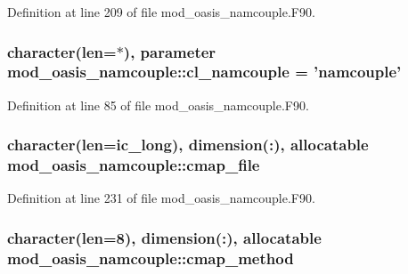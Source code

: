 Definition at line 209 of file mod\+\_\+oasis\+\_\+namcouple.\+F90.

\hypertarget{classmod__oasis__namcouple_ae023a43e29bb32ebf11f193e34d8bd85}{
\subsubsection[{cl\+\_\+namcouple}]{\setlength{\rightskip}{0pt plus 5cm}character(len=$\ast$), parameter mod\+\_\+oasis\+\_\+namcouple\+::cl\+\_\+namcouple = 'namcouple'\hspace{0.3cm}{\ttfamily [private]}}}\label{classmod__oasis__namcouple_ae023a43e29bb32ebf11f193e34d8bd85}


Definition at line 85 of file mod\+\_\+oasis\+\_\+namcouple.\+F90.

\hypertarget{classmod__oasis__namcouple_a6dbd7bccbfa28b209a4bc58131f8cf11}{
\subsubsection[{cmap\+\_\+file}]{\setlength{\rightskip}{0pt plus 5cm}character(len=ic\+\_\+long), dimension(\+:), allocatable mod\+\_\+oasis\+\_\+namcouple\+::cmap\+\_\+file\hspace{0.3cm}{\ttfamily [private]}}}\label{classmod__oasis__namcouple_a6dbd7bccbfa28b209a4bc58131f8cf11}


Definition at line 231 of file mod\+\_\+oasis\+\_\+namcouple.\+F90.

\hypertarget{classmod__oasis__namcouple_ac8c1f0014f2c3cbe0cc4fcb09e54dde3}{
\subsubsection[{cmap\+\_\+method}]{\setlength{\rightskip}{0pt plus 5cm}character(len=8), dimension(\+:), allocatable mod\+\_\+oasis\+\_\+namcouple\+::cmap\+\_\+method\hspace{0.3cm}{\ttfamily [private]}}}\label{classmod__oasis__namcouple_ac8c1f0014f2c3cbe0cc4fcb09e54dde3}


